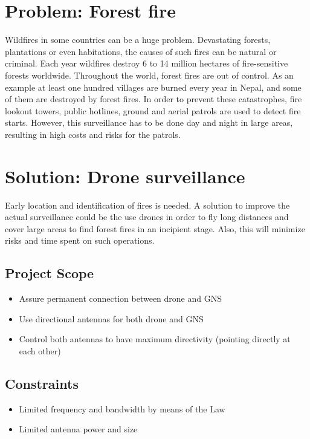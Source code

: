 \section{Problem: Forest fire}
Wildfires in some countries can be a huge problem. Devastating forests, plantations or even habitations, the causes of such fires can be natural or criminal.
Each year wildfires destroy 6 to 14 million hectares of fire-sensitive forests worldwide. Throughout the world, forest fires are out of control. As an example at least one hundred villages are burned every year in Nepal, and some of them are destroyed by forest fires.
In order to prevent these catastrophes, fire lookout towers, public hotlines, ground and aerial patrols are used to detect fire starts. However, this surveillance has to be done day and night in large areas, resulting in high costs and risks for the patrols.

\section{Solution: Drone surveillance}
Early location and identification of fires is needed. A solution to improve the actual surveillance could be the use drones in order to fly long distances and cover large areas to find forest fires in an incipient stage. Also, this will minimize risks and time spent on such operations. 

\subsection{Project Scope}
\begin{itemize}  
        \item Assure permanent connection between drone and GNS
        \item Use directional antennas for both drone and GNS 
        \item Control both antennas to have maximum directivity (pointing directly at each other)
\end{itemize}

\subsection{Constraints}
\begin{itemize}  
        \item Limited frequency and bandwidth by means of the Law
        \item Limited antenna power and size
\end{itemize}

